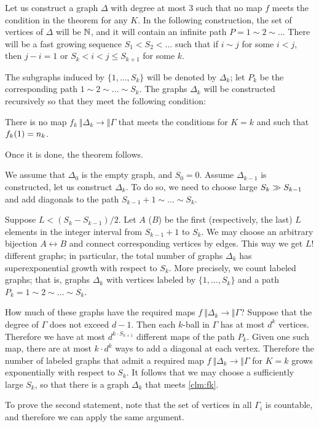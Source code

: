 \arxiv{\documentclass[a4paper,10pt]{article}}{\documentclass{mjm}}
\begin{document}
Let us construct a graph $\Delta$ with degree at most $3$ such that no map $f$ meets the condition in the theorem for any $K$.
In the following construction, the set of vertices of $\Delta$ will be $\mathbb{N}$, and it will contain an infinite path $P=1\sim 2\sim \dots$
There will be a fast growing sequence $S_1<S_2<\dots$ such that 
if $i\sim j$ for some $i<j$, then $j-i=1$ or $S_k<i<j\le S_{k+1}$ for some $k$.

The subgraphs induced by $\{1,\dots, S_k\}$ will be denoted by $\Delta_k$;
let $P_k$ be the corresponding path $1\sim 2\sim \dots \sim S_k$.
The graphs $\Delta_k$ will be constructed recursively so that they meet the following condition:
\begin{clm}{}\label{clm:fk}
There is no map $f_k\:\Vert \Delta_k\to \Vert \Gamma$ that meets the conditions for $K=k$ and such that $f_k(1)\z=n_k$.
\end{clm}
Once it is done, the theorem follows. 

We assume that $\Delta_0$ is the empty graph, and $S_0=0$.
Assume $\Delta_{k-1}$ is constructed, let us  construct $\Delta_k$.
To do so, we need to choose large $S_k\z\gg S_{k-1}$ and add diagonals to the path $S_{k-1}+1\sim\dots\sim S_k$.

Suppose $L<(S_k-S_{k-1})/2$.
Let $A$ ($B$) be the first (respectively, the last) $L$ elements in the integer interval from $S_{k-1}+1$ to $S_k$.
We may choose an arbitrary bijection $A\leftrightarrow B$ and connect corresponding vertices by edges.
This way we get $L!$ different graphs; in particular, the total number of graphs $\Delta_k$ has superexponential growth with respect to $S_k$.
More precisely, we count labeled graphs; that is, graphs $\Delta_k$ with vertices labeled by $\{1,\dots,S_k\}$ and a path $P_k=1\sim 2\sim\dots\sim S_k$.

How much of these graphs have the required maps $f\:\Vert \Delta_k\to \Vert \Gamma$?
Suppose that the degree of $\Gamma$ does not exceed $d-1$.
Then each $k$-ball in $\Gamma$ has at most $d^k$ vertices.
Therefore we have at most $d^{k\cdot S_{k+1}}$ different maps of the path $P_k$.
Given one such map, there are at most $k\cdot d^k$ ways to add a diagonal at each vertex.
Therefore the number of labeled graphs that admit a required map $f\:\Vert \Delta_k\to \Vert \Gamma$ for $K=k$ grows exponentially with respect to $S_k$.
It follows that we may choose a sufficiently large $S_k$,
so that there is a graph $\Delta_k$ that meets \ref{clm:fk}.

To prove the second statement, note that the set of vertices in all $\Gamma_i$ is countable,
and therefore we can apply the same argument.
\qeds
\end{document}

